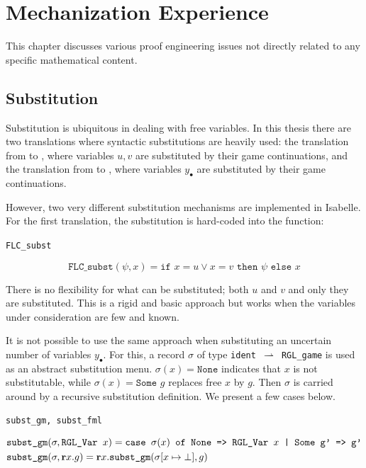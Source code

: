 
\chapter{Mechanization Experience}

\label{chp5:mech_exp}

This chapter discusses various proof engineering issues not directly related to any specific mathematical content.

\section{Substitution}
Substitution is ubiquitous in dealing with free variables. In this thesis there are two translations where syntactic substitutions are heavily used: the translation from \RGL{} to \FLC{}, where variables $u,v$ are substituted by their game continuations, and the translation from \GLs{} to \rlGL{}, where variables $y_\bullet$ are substituted by their game continuations.

However, two very different substitution mechanisms are implemented in Isabelle. For the first translation, the substitution is hard-coded into the function:

\begin{bdefinition}

\texttt{FLC\_subst}

\[\texttt{FLC\_subst}(\psi,x) = \texttt{if } x=u \vee x=v \texttt{ then } \psi \texttt{ else } x\]
    
\end{bdefinition}

There is no flexibility for what can be substituted; both $u$ and $v$ and only they are substituted. This is a rigid and basic approach but works when the variables under consideration are few and known.

It is not possible to use the same approach when substituting an uncertain number of variables $y_\bullet$. For this, a record $\sigma$ of type \texttt{ident $\mathtt{\rightharpoonup}$ RGL\_game} is used as an abstract substitution menu. $\sigma(x) = \texttt{None}$ indicates that $x$ is not substitutable, while $\sigma(x) = \texttt{Some }g$ replaces free $x$ by $g$. Then $\sigma$ is carried around by a recursive substitution definition. We present a few cases below.

\begin{bdefinition}

\texttt{subst\_gm, subst\_fml}

\begin{align*}
& \texttt{subst\_gm}(\sigma,\texttt{RGL\_Var }x) = \texttt{case } \sigma(x) \texttt{ of None => RGL\_Var } x \texttt{ | Some g' => g'} \\
& \texttt{subst\_gm}(\sigma,\textbf{r} x. g) = \textbf{r} x. \texttt{subst\_gm} (\sigma[x\mapsto \bot], g)
\end{align*}
\end{bdefinition}

